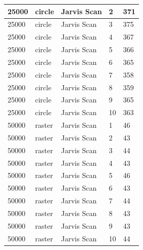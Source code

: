 \documentclass[12pt]{article}
\begin{document}
\begin{longtable}{|l|l|l|l|l|}
25000        & circle            & Jarvis Scan & 2          & 371                           \\ \hline
25000        & circle            & Jarvis Scan & 3          & 375                           \\ \hline
25000        & circle            & Jarvis Scan & 4          & 367                           \\ \hline
25000        & circle            & Jarvis Scan & 5          & 366                           \\ \hline
25000        & circle            & Jarvis Scan & 6          & 365                           \\ \hline
25000        & circle            & Jarvis Scan & 7          & 358                           \\ \hline
25000        & circle            & Jarvis Scan & 8          & 359                           \\ \hline
25000        & circle            & Jarvis Scan & 9          & 365                           \\ \hline
25000        & circle            & Jarvis Scan & 10         & 363                           \\ \hline
50000        & raster            & Jarvis Scan & 1          & 46                            \\ \hline
50000        & raster            & Jarvis Scan & 2          & 43                            \\ \hline
50000        & raster            & Jarvis Scan & 3          & 44                            \\ \hline
50000        & raster            & Jarvis Scan & 4          & 43                            \\ \hline
50000        & raster            & Jarvis Scan & 5          & 46                            \\ \hline
50000        & raster            & Jarvis Scan & 6          & 43                            \\ \hline
50000        & raster            & Jarvis Scan & 7          & 44                            \\ \hline
50000        & raster            & Jarvis Scan & 8          & 43                            \\ \hline
50000        & raster            & Jarvis Scan & 9          & 43                            \\ \hline
50000        & raster            & Jarvis Scan & 10         & 44                            \\ \hline

\end{longtable}
\end{document}
